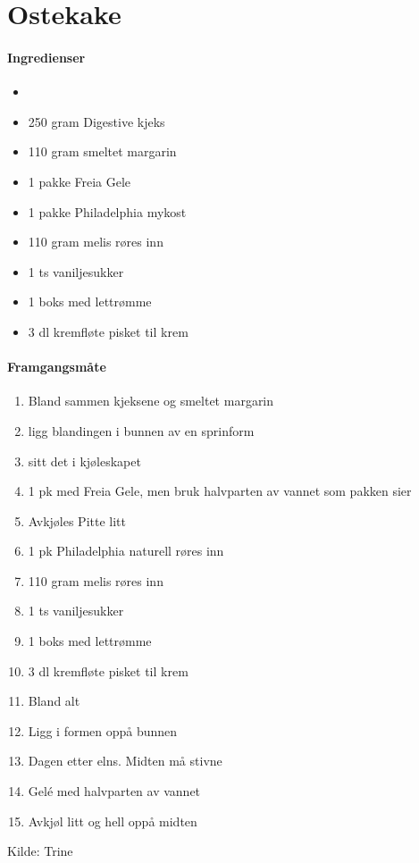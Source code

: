 \section{﻿Ostekake}


\paragraph{Ingredienser}
\begin{itemize}[noitemsep]
	\item
	\item 250 gram Digestive kjeks
	\item 110 gram smeltet margarin
	\item 1 pakke Freia Gele
	\item 1 pakke Philadelphia mykost
	\item 110 gram melis røres inn
	\item 1 ts vaniljesukker
	\item 1 boks med lettrømme
	\item 3 dl kremfløte pisket til krem

\end{itemize}

\paragraph{Framgangsmåte}
\begin{enumerate}[noitemsep]
	\item Bland sammen kjeksene og smeltet margarin
	\item ligg blandingen i bunnen av en sprinform
	\item sitt det i kjøleskapet
	\item 1 pk med Freia Gele, men bruk halvparten av vannet som pakken sier
	\item Avkjøles Pitte litt
	\item 1 pk Philadelphia naturell røres inn
	\item 110 gram melis røres inn
	\item 1 ts vaniljesukker
	\item 1 boks med lettrømme
	\item 3 dl kremfløte pisket til krem
	\item Bland alt
	\item Ligg i formen oppå bunnen
	\item Dagen etter elns.  Midten må stivne
	\item Gelé med halvparten av vannet
	\item Avkjøl litt og hell oppå midten
\end{enumerate}



Kilde: Trine
